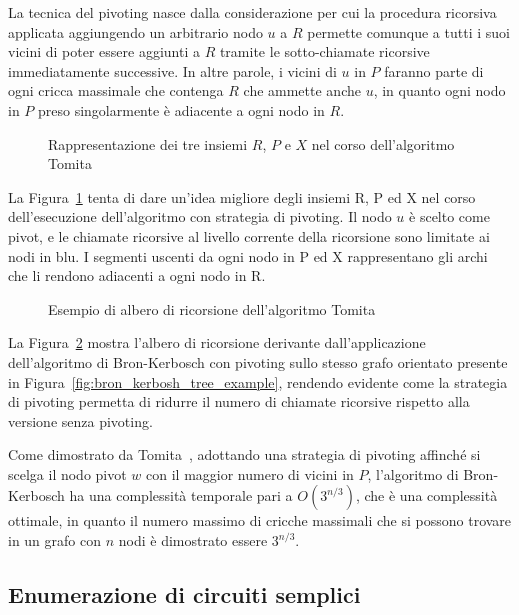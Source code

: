 La tecnica del pivoting nasce dalla considerazione per cui la procedura ricorsiva applicata aggiungendo un arbitrario
nodo $u$ a $R$ permette comunque a tutti i suoi vicini di poter essere aggiunti a $R$ tramite le sotto-chiamate
ricorsive immediatamente successive.
In altre parole, i vicini di $u$ in $P$ faranno parte di ogni cricca massimale che
contenga $R$ che ammette anche $u$, in quanto ogni nodo in $P$ preso singolarmente è adiacente a ogni nodo in $R$.

\begin{figure}[H]
    \centering
    
    \caption{Rappresentazione dei tre insiemi $R$, $P$ e $X$ nel corso dell'algoritmo Tomita}
    \label{fig:bron_kerbosh_pivot_example}
\end{figure}

La Figura~\ref{fig:bron_kerbosh_pivot_example} tenta di dare un'idea migliore degli insiemi R, P ed X nel corso
dell'esecuzione dell'algoritmo con strategia di pivoting.
Il nodo $u$ è scelto come pivot, e le chiamate ricorsive al livello corrente della ricorsione sono limitate ai nodi
in blu.
I segmenti uscenti da ogni nodo in P ed X rappresentano gli archi che li rendono adiacenti a ogni nodo in R\@.

\begin{figure}
    \centering
    
    \caption{Esempio di albero di ricorsione dell'algoritmo Tomita}
    \label{fig:bron_kerbosh_pivot_tree_example}
\end{figure}

La Figura~\ref{fig:bron_kerbosh_pivot_tree_example} mostra l'albero di ricorsione derivante dall'applicazione
dell'algoritmo di Bron-Kerbosch con pivoting sullo stesso grafo orientato presente in Figura~\ref{fig:bron_kerbosh_tree_example},
rendendo evidente come la strategia di pivoting permetta di ridurre il numero di chiamate ricorsive rispetto alla
versione senza pivoting.


Come dimostrato da Tomita~\cite{TOMITA200628}, adottando una strategia di pivoting affinché si scelga il nodo pivot
$w$ con il maggior numero di vicini in $P$, l'algoritmo di Bron-Kerbosch ha una complessità temporale pari a
$O(3^{n/3})$, che è una complessità ottimale, in quanto il numero massimo di cricche massimali che si possono
trovare in un grafo con $n$ nodi è dimostrato essere $3^{n/3}$.

\subsection{Enumerazione di circuiti semplici}\label{sec:enumerazione-di-cicli}

